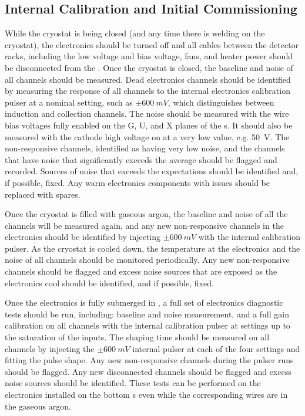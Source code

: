 \subsection{Internal Calibration and Initial Commissioning}
\label{sec:fdsp-tpcelec-integration-calib}

While the cryostat is being closed (and any time there is welding 
on the cryostat), the electronics should be turned off and all 
cables between the detector racks, including the low voltage
and bias voltage, fans, and heater power should be disconnected 
from the . Once the cryostat is closed, the baseline 
and noise of all channels should be measured. Dead electronics channels 
should be identified by measuring the response of all channels to 
the internal electronics calibration pulser at a nominal setting, 
such as $\pm\SI{600}{mV}$, which distinguishes between induction 
and collection channels. The noise should be measured with the wire bias 
voltages fully enabled on the G, U, and X planes of the s. 
It should also be measured with the cathode high voltage on at a very 
low value, e.g. \SI{50}{V}. The non-responsive channels, identified
as having very low noise, and the channels that have noise that 
significantly exceeds the average should be flagged and recorded.
Sources of noise that exceeds the expectations should be identified
and, if possible, fixed. Any warm electronics components with
issues should be replaced with spares.

Once the cryostat is filled with gaseous
argon, the baseline and noise of all the channels will be measured
again, and any new non-responsive channels in the electronics 
should be identified by injecting $\pm\SI{600}{mV}$ with the 
internal calibration pulser. As the cryostat is cooled down, the 
temperature at the electronics and the noise of all channels should 
be monitored periodically. Any new non-responsive channels should 
be flagged and excess noise sources that are exposed as the 
electronics cool should be identified, and if possible, fixed.

Once the electronics is fully submerged in , a full 
set of electronics diagnostic tests should be run, including: 
baseline and noise measurement, and a full gain calibration on 
all channels with the internal calibration pulser at settings 
up to the saturation of the  inputs. The shaping time 
should be measured on all channels by injecting the $\pm\SI{600}{mV}$
internal pulser at each of the four settings and fitting the 
pulse shape. Any new non-responsive channels during the pulser 
runs should be flagged. Any new disconnected channels should be 
flagged and excess noise sources should be identified. These tests 
can be performed on the electronics installed on the bottom
s even while the corresponding wires are in 
the gaseous argon.
